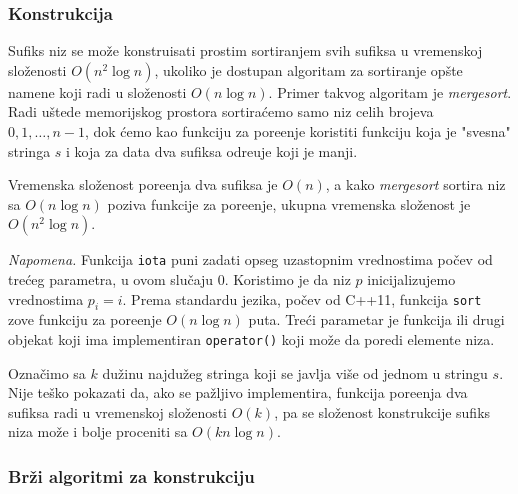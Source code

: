 \subsubsection{Konstrukcija}

Sufiks niz se mo\v ze konstruisati prostim sortiranjem svih sufiksa u vremenskoj slo\v zenosti $O(n^2 \log n)$, ukoliko je dostupan algoritam za sortiranje op\v ste namene koji radi u slo\v zenosti $O(n \log n)$. Primer takvog algoritam je \textit{mergesort}. Radi u\v stede memorijskog prostora sortira\' cemo samo niz celih brojeva $0,1,\ldots,n-1$, dok \' cemo kao funkciju za pore\dj enje koristiti funkciju koja je "svesna" stringa $s$ i koja za data dva sufiksa odre\dj uje koji je manji.

\noindent
\begin{minipage}[l]{\textwidth}

\end{minipage}

Vremenska slo\v zenost pore\dj enja dva sufiksa je $O(n)$, a kako \textit{mergesort} sortira niz sa $O(n \log n)$ poziva funkcije za pore\dj enje, ukupna vremenska slo\v zenost je $O(n^2 \log n)$.

\noindent
\begin{minipage}[l]{\textwidth}

\end{minipage}

\textit{Napomena.} Funkcija \texttt{iota} puni zadati opseg uzastopnim vrednostima po\v cev od tre\' ceg parametra, u ovom slu\v caju $0$. Koristimo je da niz $p$ inicijalizujemo vrednostima $p_i = i$. Prema standardu jezika, po\v cev od C++11, funkcija \texttt{sort} zove funkciju za pore\dj enje $O(n \log n)$ puta. \cite{sortnlogn} Tre\' ci parametar je funkcija ili drugi objekat koji ima implementiran \texttt{operator()} koji mo\v ze da poredi elemente niza.

Ozna\v cimo sa $k$ du\v zinu najdu\v zeg stringa koji se javlja vi\v se od jednom u stringu $s$. Nije te\v sko pokazati da, ako se pa\v zljivo implementira, funkcija pore\dj enja dva sufiksa radi u vremenskoj slo\v zenosti $O(k)$, pa se slo\v zenost konstrukcije sufiks niza mo\v ze i bolje proceniti sa $O(kn \log n)$.

\subsubsection{Br\v zi algoritmi za konstrukciju}

